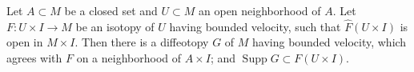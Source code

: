 Let $A \subset M$ be a closed set and $U \subset M$ an open neighborhood of $A$. Let $F: U \times I \to M$ be an isotopy of $U$ having bounded velocity, such that $\widehat{F}(U \times I)$ is open in $M \times I$. Then there is a diffeotopy $G$ of $M$ having bounded velocity, which agrees with $F$ on a neighborhood of $A \times I$; and $\operatorname{Supp} G \subset F(U \times I)$.
